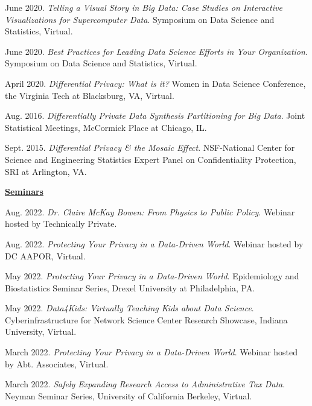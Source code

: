 \documentclass[11pt, letterpaper, roman]{moderncv} %
\begin{document}
\begin{etaremune}[topsep=0pt, itemsep=2pt, partopsep=0pt, parsep=0pt]
    \item June 2020. \textit{Telling a Visual Story in Big Data: Case Studies on Interactive Visualizations for Supercomputer Data}. Symposium on Data Science and Statistics, Virtual.
  
    \item June 2020. \textit{Best Practices for Leading Data Science Efforts in Your Organization}. Symposium on Data Science and Statistics, Virtual.
  
    \item April 2020. \textit{Differential Privacy: What is it?} Women in Data Science Conference, the Virginia Tech at Blacksburg, VA, Virtual.

    \item Aug. 2016. \textit{Differentially Private Data Synthesis Partitioning for Big Data}. Joint Statistical Meetings, McCormick Place at Chicago, IL.
    
    \item Sept. 2015. \textit{Differential Privacy \& the Mosaic Effect}. NSF-National Center for Science and Engineering Statistics Expert Panel on Confidentiality Protection, SRI at Arlington, VA.

\vspace{6pt}
\hspace{-0.30in}\underline{\textbf{\large Seminars}}\normalsize
    \item Aug. 2022. \textit{Dr. Claire McKay Bowen: From Physics to Public Policy}. Webinar hosted by Technically Private.
    
    \item Aug. 2022. \textit{Protecting Your Privacy in a Data-Driven World}. Webinar hosted by DC AAPOR, Virtual.
    
    \item May 2022. \textit{Protecting Your Privacy in a Data-Driven World}. Epidemiology and Biostatistics Seminar Series, Drexel University at Philadelphia, PA.
    
    \item May 2022. \textit{Data4Kids: Virtually Teaching Kids about Data Science}. Cyberinfrastructure for Network Science Center Research Showcase, Indiana University, Virtual.
    
    \item March 2022. \textit{Protecting Your Privacy in a Data-Driven World}. Webinar hosted by Abt. Associates, Virtual.
    
    \item March 2022. \textit{Safely Expanding Research Access to Administrative Tax Data}. Neyman Seminar Series, University of California Berkeley, Virtual.
    

\end{etaremune}
\end{document}

